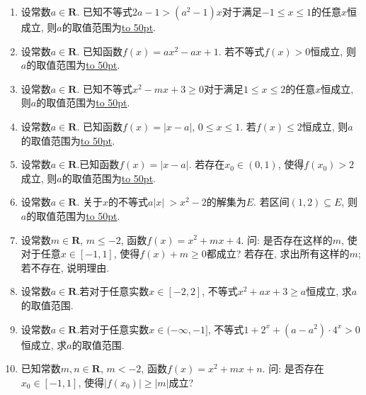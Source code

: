 \documentclass[10pt,a4paper]{article}
\newcommand{\blank}[1]{\underline{\hbox to #1pt{}}}
\begin{document}
\begin{enumerate}[1.]
\item 设常数$a\in \mathbf{R}$. 已知不等式$2a-1>(a^2-1)x$对于满足$-1\le x\le 1$的任意$x$恒成立, 则$a$的取值范围为\blank{50}.
\item 设常数$a\in \mathbf{R}$. 已知函数$f(x)=ax^2-ax+1$. 若不等式$f(x)>0$恒成立, 则$a$的取值范围为\blank{50}.
\item 设常数$a\in \mathbf{R}$. 已知不等式$x^2-mx+3\ge 0$对于满足$1\le x\le 2$的任意$x$恒成立, 则$a$的取值范围为\blank{50}.
\item 设常数$a\in \mathbf{R}$. 已知函数$f(x)=|x-a|$, $0\le x\le 1$. 若$f(x)\le 2$恒成立, 则$a$的取值范围为\blank{50}.
\item 设常数$a\in \mathbf{R}$.已知函数$f(x)=|x-a|$. 若存在${x_0}\in (0,1)$, 使得$f({x_0})>2$成立, 则$a$的取值范围为\blank{50}.
\item 设常数$a\in \mathbf{R}$. 关于$x$的不等式$a|x|\ >x^2-2$的解集为$E$. 若区间$(1,2)\subseteq E$, 则$a$的取值范围为\blank{50}.
\item 设常数$m\in \mathbf{R}$, $m\le -2$, 函数$f(x)=x^2+mx+4$. 问: 是否存在这样的$m$, 使对于任意$x\in [-1,1]$, 使得$f(x)+m\ge 0$都成立? 若存在, 求出所有这样的$m$; 若不存在, 说明理由.
\item 设常数$a\in \mathbf{R}$.若对于任意实数$x\in [-2,2]$, 不等式$x^2+ax+3\ge a$恒成立, 求$a$的取值范围.
\item 设常数$a\in \mathbf{R}$.若对于任意实数$x\in (-\infty ,-1]$, 不等式$1+2^x+(a-a^2)\cdot 4^x>0$恒成立, 求$a$的取值范围.
\item 已知常数$m, n\in \mathbf{R}$, $m<-2$, 函数$f(x)=x^2+mx+n$. 问: 是否存在$x_0\in [-1,1]$, 使得$|f(x_0)|\ge |m|$成立?



\end{enumerate}
\end{document}
